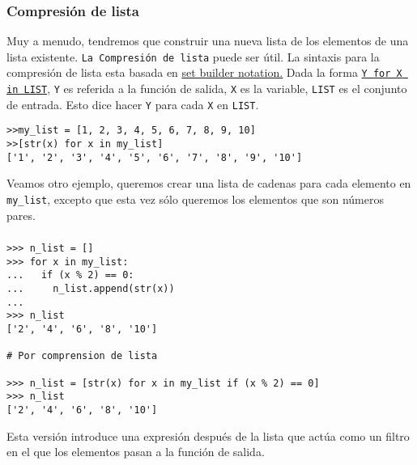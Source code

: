 \documentclass[10pt]{beamer}
\begin{document}
\begin{frame}[fragile]
\frametitle{Compresi\'on de lista}

Muy a menudo, tendremos que construir una nueva lista de los elementos de una lista existente.  \texttt{La Compresi\'on de lista} puede ser \'util. La sintaxis para la compresi\'on de lista esta basada en \href{http://en.wikipedia.org/wiki/Set-builder_notation}{\underline{set builder notation.}} Dada la forma \texttt{\underline{Y for X in LIST}}, \texttt{Y} es referida a la funci\'on de salida, \texttt{X} es la variable, \texttt{LIST} es el conjunto de entrada. Esto dice hacer  \texttt{Y} para cada \texttt{X} en 
\texttt{LIST}.

\vspace{0.2cm}

\begin{lstlisting}
>>my_list = [1, 2, 3, 4, 5, 6, 7, 8, 9, 10]
>>[str(x) for x in my_list]
['1', '2', '3', '4', '5', '6', '7', '8', '9', '10']
\end{lstlisting}

\vspace{0.2cm}

Veamos otro ejemplo, queremos crear una lista  de cadenas para cada elemento en \texttt{my\_list}, excepto que esta vez s\'olo queremos los elementos que son n\'umeros pares.
\end{frame}

\begin{frame}[fragile]
\frametitle{}
\begin{lstlisting}
>>> n_list = []
>>> for x in my_list:
...   if (x % 2) == 0:
...     n_list.append(str(x))
... 
>>> n_list
['2', '4', '6', '8', '10']

# Por comprension de lista

>>> n_list = [str(x) for x in my_list if (x % 2) == 0]
>>> n_list
['2', '4', '6', '8', '10']
\end{lstlisting}

\vspace{0.2cm}

Esta versi\'on introduce  una expresi\'on despu\'es de la lista que act\'ua como un filtro en el que los elementos pasan a la funci\'on de salida.
\end{frame}
\end{document}
